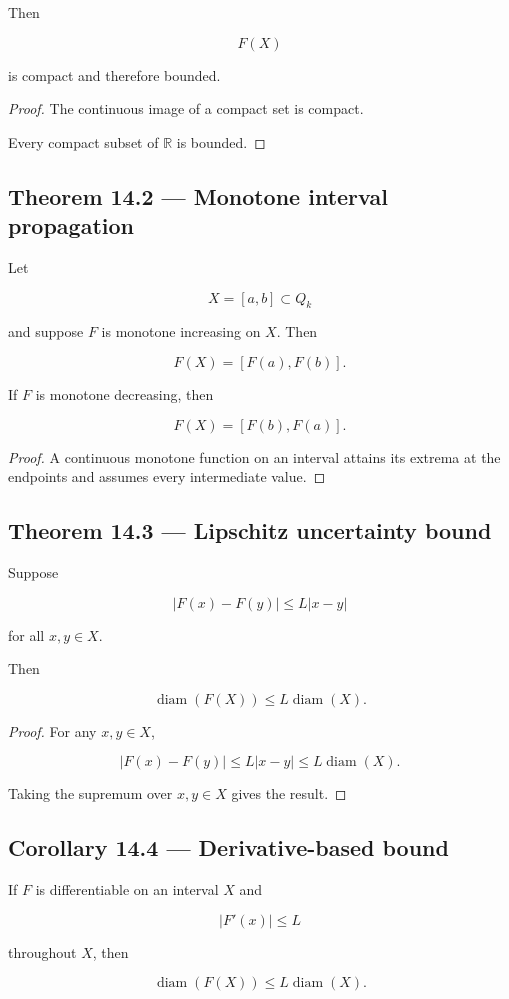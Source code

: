 \documentclass[11pt,oneside,openany]{book}
\newcommand{\PCsubsection}[1]{%
  \subsection*{#1}%
}
\begin{document}
Then

\[
F(X)
\]

is compact and therefore bounded.

\begin{proof}
The continuous image of a compact set is compact.

Every compact subset of \(\mathbb R\) is bounded.

\end{proof}

\PCsubsection{Theorem 14.2 --- Monotone interval propagation}

Let

\[
X=[a,b]\subset Q_k
\]

and suppose \(F\) is monotone increasing on \(X\). Then

\[
\boxed{ F(X) = [F(a),F(b)]. }
\]

If \(F\) is monotone decreasing, then

\[
\boxed{ F(X) = [F(b),F(a)]. }
\]

\begin{proof}
A continuous monotone function on an interval attains its extrema at the endpoints and assumes every intermediate value.

\end{proof}

\PCsubsection{Theorem 14.3 --- Lipschitz uncertainty bound}

Suppose

\[
|F(x)-F(y)| \leq L|x-y|
\]

for all \(x,y\in X\).

Then

\[
\boxed{ \operatorname{diam}(F(X)) \leq L\operatorname{diam}(X). }
\]

\begin{proof}
For any \(x,y\in X\),

\[
|F(x)-F(y)| \leq L|x-y| \leq L\operatorname{diam}(X).
\]

Taking the supremum over \(x,y\in X\) gives the result.

\end{proof}

\PCsubsection{Corollary 14.4 --- Derivative-based bound}

If \(F\) is differentiable on an interval \(X\) and

\[
|F'(x)|\leq L
\]

throughout \(X\), then

\[
\operatorname{diam}(F(X)) \leq L\operatorname{diam}(X).
\]
\end{document}
